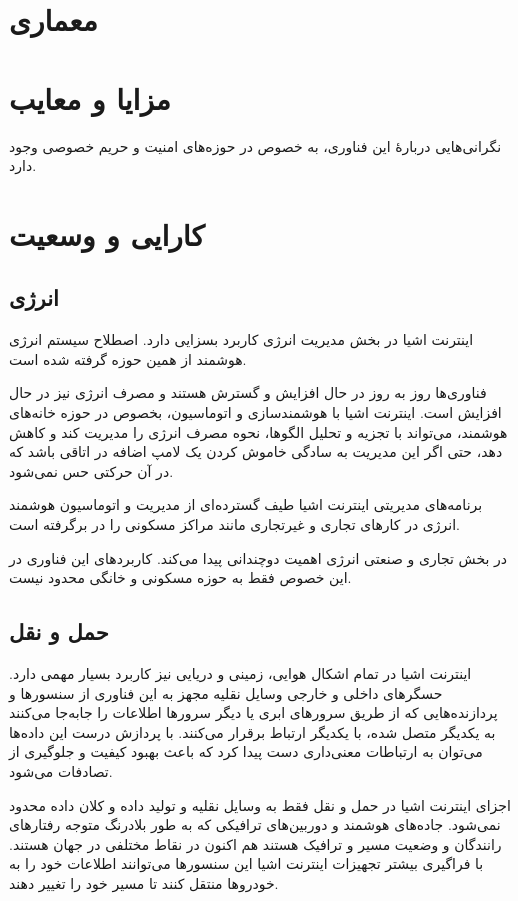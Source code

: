 \documentclass[a4paper]{article}
\begin{document}
\section{معماری}

\section{مزایا و معایب}

نگرانی‌هایی دربارهٔ این فناوری، به خصوص در حوزه‌های امنیت و حریم خصوصی وجود دارد.\cite{wp:iot}

\section{کارایی و وسعیت}
\subsection{انرژی}
اینترنت اشیا در بخش مدیریت انرژی کاربرد بسزایی دارد.
اصطلاح سیستم انرژی هوشمند از همین حوزه گرفته شده است.


فناوری‌ها روز به روز در حال افزایش و گسترش هستند و مصرف انرژی نیز در حال افزایش است. اینترنت اشیا با هوشمندسازی و اتوماسیون، بخصوص در حوزه خانه‌های هوشمند،
می‌تواند با تجزیه و تحلیل الگوها، نحوه مصرف انرژی را مدیریت کند و کاهش دهد، حتی اگر این مدیریت به سادگی خاموش کردن یک لامپ اضافه در اتاقی باشد که در آن حرکتی حس نمی‌شود.

برنامه‌های مدیریتی اینترنت اشیا طیف گسترده‌ای از مدیریت و اتوماسیون هوشمند انرژی در کارهای تجاری و غیرتجاری مانند مراکز مسکونی را در برگرفته است.

در بخش تجاری و صنعتی انرژی اهمیت دوچندانی پیدا می‌کند.
کاربردهای این فناوری در این خصوص فقط به حوزه مسکونی و خانگی محدود نیست.

\subsection{حمل و نقل}
اینترنت اشیا در تمام اشکال هوایی، زمینی و دریایی نیز کاربرد بسیار مهمی دارد.
حسگرهای داخلی و خارجی وسایل نقلیه مجهز به این فناوری از سنسورها و پردازنده‌هایی که از طریق سرورهای ابری یا دیگر سرورها اطلاعات را جابه‌جا می‌کنند به یکدیگر متصل شده،
با یکدیگر ارتباط برقرار می‌کنند.
با پردازش درست این داده‌ها می‌توان به ارتباطات معنی‌داری دست پیدا کرد که باعث بهبود کیفیت و جلوگیری از تصادفات می‌شود.

اجزای اینترنت اشیا در حمل و نقل فقط به وسایل نقلیه و تولید داده و کلان داده محدود نمی‌شود.
جاده‌های هوشمند و دوربین‌های ترافیکی که به طور بلادرنگ متوجه رفتارهای رانندگان و وضعیت مسیر و ترافیک هستند هم اکنون در نقاط مختلفی در جهان هستند.
با فراگیری بیشتر تجهیزات اینترنت اشیا این سنسورها می‌توانند اطلاعات خود را به خودروها منتقل کنند تا مسیر خود را تغییر دهند.
\end{document}
